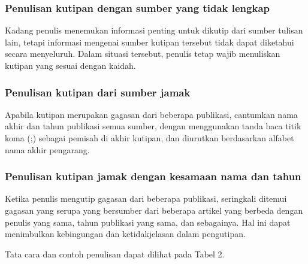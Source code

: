 \documentclass[
  indonesian,
  letterpaper,
]{scrbook}
\begin{document}
\subsubsection{Penulisan kutipan dengan sumber yang tidak
lengkap}\label{penulisan-kutipan-dengan-sumber-yang-tidak-lengkap}

Kadang penulis menemukan informasi penting untuk dikutip dari sumber
tulisan lain, tetapi informasi mengenai sumber kutipan tersebut tidak
dapat diketahui secara menyeluruh. Dalam situasi tersebut, penulis tetap
wajib menuliskan kutipan yang sesuai dengan kaidah.

\subsubsection{Penulisan kutipan dari sumber
jamak}\label{penulisan-kutipan-dari-sumber-jamak}

Apabila kutipan merupakan gagasan dari beberapa publikasi, cantumkan
nama akhir dan tahun publikasi semua sumber, dengan menggunakan tanda
baca titik koma (;) sebagai pemisah di akhir kutipan, dan diurutkan
berdasarkan alfabet nama akhir pengarang.

\subsubsection{Penulisan kutipan jamak dengan kesamaan nama dan
tahun}\label{penulisan-kutipan-jamak-dengan-kesamaan-nama-dan-tahun}

Ketika penulis mengutip gagasan dari beberapa publikasi, seringkali
ditemui gagasan yang serupa yang bersumber dari beberapa artikel yang
berbeda dengan penulis yang sama, tahun publikasi yang sama, dan
sebagainya. Hal ini dapat menimbulkan kebingungan dan ketidakjelasan
dalam pengutipan.

Tata cara dan contoh penulisan dapat dilihat pada Tabel 2.
\end{document}
